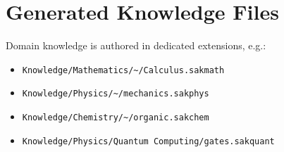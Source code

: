 \documentclass[11pt,a4paper]{article}
\begin{document}
\section{Generated Knowledge Files}
Domain knowledge is authored in dedicated extensions, e.g.:
\begin{itemize}
\item \texttt{Knowledge/Mathematics/\textasciitilde/Calculus.sakmath}
\item \texttt{Knowledge/Physics/\textasciitilde/mechanics.sakphys}
\item \texttt{Knowledge/Chemistry/\textasciitilde/organic.sakchem}
\item \texttt{Knowledge/Physics/Quantum Computing/gates.sakquant}
\end{itemize}
\end{document}
